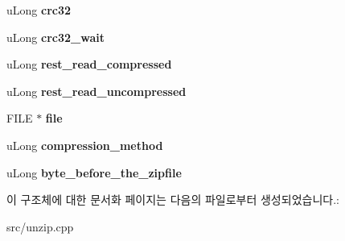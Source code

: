 \begin{DoxyCompactItemize}
u\+Long {\bfseries crc32}
\item 
\mbox{\label{structfile__in__zip__read__info__s_a6120c521be40e8ba530249f0c766ab9d}} 
u\+Long {\bfseries crc32\+\_\+wait}
\item 
\mbox{\label{structfile__in__zip__read__info__s_a4c7b8e6502f7195feefd676dff0bb494}} 
u\+Long {\bfseries rest\+\_\+read\+\_\+compressed}
\item 
\mbox{\label{structfile__in__zip__read__info__s_a8e3801645cfa5bfd147fd8d037fcf9a5}} 
u\+Long {\bfseries rest\+\_\+read\+\_\+uncompressed}
\item 
\mbox{\label{structfile__in__zip__read__info__s_ac1b9fbf81aac280e5e9f6eaca864161b}} 
F\+I\+LE $\ast$ {\bfseries file}
\item 
\mbox{\label{structfile__in__zip__read__info__s_a86cbaa96568192cae9ab9cd606963fdb}} 
u\+Long {\bfseries compression\+\_\+method}
\item 
\mbox{\label{structfile__in__zip__read__info__s_a52c8e657a1238a3b9fa87b4167d9b7a3}} 
u\+Long {\bfseries byte\+\_\+before\+\_\+the\+\_\+zipfile}
\end{DoxyCompactItemize}


이 구조체에 대한 문서화 페이지는 다음의 파일로부터 생성되었습니다.\+:\begin{DoxyCompactItemize}
\item 
src/unzip.\+cpp\end{DoxyCompactItemize}
